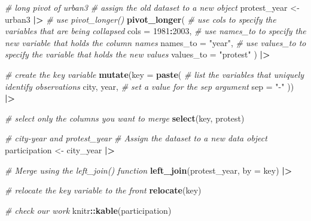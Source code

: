 \documentclass[
]{book}
\newenvironment{Shaded}{\begin{snugshade}}{\end{snugshade}}
\newcommand{\AttributeTok}[1]{\textcolor[rgb]{0.13,0.29,0.53}{#1}}
\newcommand{\CommentTok}[1]{\textcolor[rgb]{0.56,0.35,0.01}{\textit{#1}}}
\newcommand{\FunctionTok}[1]{\textcolor[rgb]{0.13,0.29,0.53}{\textbf{#1}}}
\newcommand{\NormalTok}[1]{#1}
\newcommand{\OtherTok}[1]{\textcolor[rgb]{0.56,0.35,0.01}{#1}}
\newcommand{\SpecialCharTok}[1]{\textcolor[rgb]{0.81,0.36,0.00}{\textbf{#1}}}
\newcommand{\StringTok}[1]{\textcolor[rgb]{0.31,0.60,0.02}{#1}}
\begin{document}
\begin{Shaded}
\begin{Highlighting}[]
\CommentTok{\# long pivot of \textasciigrave{}urban3\textasciigrave{}}
\CommentTok{\# assign the old dataset to a new object}
\NormalTok{protest\_year }\OtherTok{\textless{}{-}}\NormalTok{ urban3 }\SpecialCharTok{|\textgreater{}}
  \CommentTok{\# use pivot\_longer()}
  \FunctionTok{pivot\_longer}\NormalTok{(}
    \CommentTok{\# use \textasciigrave{}cols\textasciigrave{} to specify the variables that are being collapsed}
    \AttributeTok{cols =} \StringTok{\textasciigrave{}}\AttributeTok{1981}\StringTok{\textasciigrave{}}\SpecialCharTok{:}\StringTok{\textasciigrave{}}\AttributeTok{2003}\StringTok{\textasciigrave{}}\NormalTok{,}
    \CommentTok{\# use \textasciigrave{}names\_to\textasciigrave{} to specify the new variable that holds the column names}
    \AttributeTok{names\_to =} \StringTok{"year"}\NormalTok{,}
    \CommentTok{\# use \textasciigrave{}values\_to\textasciigrave{} to specify the variable that holds the new values}
    \AttributeTok{values\_to =} \StringTok{"protest"}
\NormalTok{  ) }\SpecialCharTok{|\textgreater{}}
  
  \CommentTok{\# create the \textquotesingle{}key\textquotesingle{} variable}
 \FunctionTok{mutate}\NormalTok{(}\AttributeTok{key =} \FunctionTok{paste}\NormalTok{(}
    \CommentTok{\# list the variables that uniquely identify observations}
\NormalTok{    city,}
\NormalTok{    year,}
    \CommentTok{\# set a value for the \textasciigrave{}sep\textasciigrave{} argument}
    \AttributeTok{sep =} \StringTok{"{-}"}
\NormalTok{  )) }\SpecialCharTok{|\textgreater{}}
  
  \CommentTok{\# select only the columns you want to merge}
  \FunctionTok{select}\NormalTok{(key, protest)}

\CommentTok{\# city{-}year and protest\_year}
\CommentTok{\# Assign the dataset to a new data object}
\NormalTok{participation }\OtherTok{\textless{}{-}}\NormalTok{ city\_year }\SpecialCharTok{|\textgreater{}}
  
  \CommentTok{\# Merge using the \textasciigrave{}left\_join()\textasciigrave{} function}
  \FunctionTok{left\_join}\NormalTok{(protest\_year, }\AttributeTok{by =} \StringTok{\textquotesingle{}key\textquotesingle{}}\NormalTok{) }\SpecialCharTok{|\textgreater{}}
  
  \CommentTok{\# relocate the \textquotesingle{}key\textquotesingle{} variable to the front}
  \FunctionTok{relocate}\NormalTok{(key)}

\CommentTok{\# check our work}
\NormalTok{knitr}\SpecialCharTok{::}\FunctionTok{kable}\NormalTok{(participation)}
\end{Highlighting}
\end{Shaded}
\end{document}
